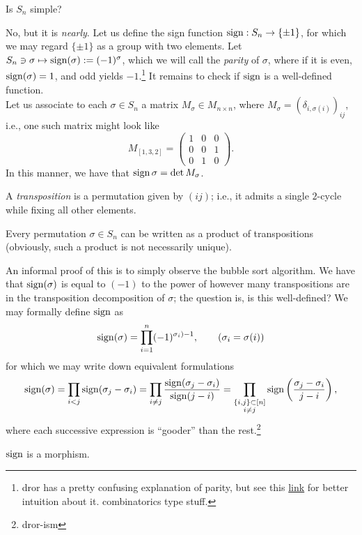 \begin{example}
    Is $S_n$ simple?
\end{example}
\noindent No, but it is \textit{nearly}. Let us define the sign function $\operatorname{sign} : S_n \to \{\pm 1\}$, for which we may regard $\{\pm 1\}$ as a group with two elements. Let $S_n \ni \sigma \mapsto \operatorname{sign}(\sigma) := (-1)^\sigma$, which we will call the \textit{parity} of $\sigma$, where if it is even, $\operatorname{sign}(\sigma) = 1$, and odd yields $-1$.\footnote{dror has a pretty confusing explanation of parity, but see this \href{https://en.wikipedia.org/wiki/Parity_of_a_permutation}{link} for better intuition about it. combinatorics type stuff.} It remains to check if $\operatorname{sign}$ is a well-defined function.
\\[8pt]
Let us associate to each $\sigma \in S_n$ a matrix $M_\sigma \in M_{n \times n}$, where $M_\sigma = (\delta_{i, \sigma(i)})_{ij}$, i.e., one such matrix might look like
\[ M_{[1, 3, 2]} = \begin{pmatrix} 1 & 0 & 0 \\ 0 & 0 & 1 \\ 0 & 1 & 0 \end{pmatrix}. \]
In this manner, we have that $\operatorname{sign} \sigma = \det M_{\sigma}$.
\begin{definition}
    A \textit{transposition} is a permutation given by $(ij)$; i.e., it admits a single $2$-cycle while fixing all other elements.
\end{definition}
\begin{claim}
    Every permutation $\sigma \in S_n$ can be written as a product of transpositions (obviously, such a product is not necessarily unique).
\end{claim}
\noindent An informal proof of this is to simply observe the bubble sort algorithm. We have that $\operatorname{sign}(\sigma)$ is equal to $(-1)$ to the power of however many transpositions are in the transposition decomposition of $\sigma$; the question is, is this well-defined? We may formally define $\operatorname{sign}$ as
\[ \operatorname{sign}(\sigma) = \prod_{i=1}^n (-1)^{\sigma_i) - 1}, \tag{$\sigma_i = \sigma(i)$} \]
for which we may write down equivalent formulations
\[ \operatorname{sign}(\sigma) = \prod_{i < j} \operatorname{sign}(\sigma_j - \sigma_i) = \prod_{i \neq j} \frac{\operatorname{sign}(\sigma_j - \sigma_i)}{\operatorname{sign}(j - i)} = \prod_{\substack{\{i, j\} \subset [n] \\ i \neq j}} \operatorname{sign} \left(\frac{\sigma_j - \sigma_i}{j - i}\right), \]
where each successive expression is ``gooder'' than the rest.\footnote{dror-ism}
\begin{theorem}
    $\operatorname{sign}$ is a morphism.
\end{theorem}
